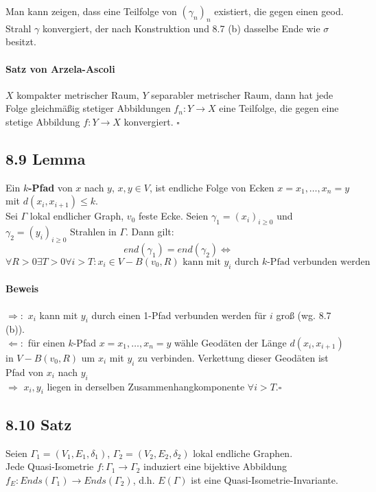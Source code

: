 \documentclass{article}
\newcommand{\df}[1]{\textbf{#1}\index{#1}}
\newcommand{\qed}{\hfill $\square$}
\begin{document}
Man kann zeigen, dass eine Teilfolge von $(\gamma_n)_n$ existiert, die gegen einen geod. Strahl $\gamma$ konvergiert, der nach Konstruktion und 8.7 (b) dasselbe Ende wie $\sigma$ besitzt.

\paragraph{Satz von Arzela-Ascoli}
$X$ kompakter metrischer Raum, $Y$ separabler metrischer Raum, dann hat jede Folge gleichmäßig stetiger Abbildungen $f_n : Y \rightarrow X$ eine Teilfolge, die gegen eine stetige Abbildung $f : Y \rightarrow X$ konvergiert.
\qed

\subsection{8.9 Lemma}
Ein \df{$k$-Pfad} von $x$ nach $y$, $x,y \in V$, ist endliche Folge von Ecken $x = x_1,\ldots, x_n = y$ mit $d(x_i, x_{i+1}) \leq k$.\\
Sei $\Gamma$ lokal endlicher Graph, $v_0$ feste Ecke. Seien $\gamma_1 = (x_i)_{i \geq 0}$ und $\gamma_2 = (y_i)_{i \geq 0}$ Strahlen in $\Gamma$. Dann gilt:
\[end(\gamma_1) = end(\gamma_2) \Longleftrightarrow\]
\[\forall R > 0 \exists T > 0\forall i > T: x_i \in V- B(v_0, R) \text{ kann mit } y_i \text{ durch }k\text{-Pfad verbunden werden} \]

\paragraph{Beweis}
$\Longrightarrow: $ $x_i$ kann mit $y_i$ durch einen 1-Pfad verbunden werden für $i$ groß (wg. 8.7 (b)).\\
$\Longleftarrow: $ für einen $k$-Pfad $x = x_1, \ldots, x_n = y$ wähle Geodäten der Länge $d(x_i,x_{i+1})$ in $V- B(v_0,R)$ um $x_i$ mit $y_i$ zu verbinden. Verkettung dieser Geodäten ist Pfad von $x_i$ nach $y_i$\\
$\Longrightarrow$ $x_i, y_i$ liegen in derselben Zusammenhangkomponente $\forall i > T$.\qed


\subsection{8.10 Satz}
Seien $\Gamma_1 = (V_1, E_1, \delta_1)$, $\Gamma_2 = (V_2, E_2, \delta_2)$ lokal endliche Graphen.\\
Jede Quasi-Isometrie $f:\Gamma_1 \rightarrow \Gamma_2$ induziert eine bijektive Abbildung $f_E : Ends(\Gamma_1) \rightarrow Ends(\Gamma_2)$, d.h. $E(\Gamma)$ ist eine Quasi-Isometrie-Invariante.
\end{document}
